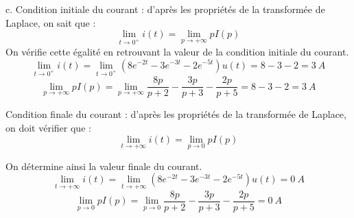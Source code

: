 \documentclass[11pt]{report}
\begin{document}
	\vspace{0.5\baselineskip}
	
	c. Condition initiale du courant : d'après les propriétés de la transformée de Laplace, on sait que :
	\begin{equation*}
		\lim_{t\rightarrow0^{+}} i(t)=\lim_{p \to +\infty} pI(p)
	\end{equation*}
	On vérifie cette égalité en retrouvant la valeur de la condition initiale du courant.
	\begin{equation*}
		\lim_{t\rightarrow0^{+}} i(t)=\lim_{t\rightarrow0^{+}}(8e^{-2t}-3e^{-3t}-2e^{-5t})u(t)=8-3-2=3~A
	\end{equation*}
	\begin{equation*}
		\lim_{p \to +\infty} pI(p)=	\lim_{p \to +\infty} \frac{8p}{p+2}-\frac{3p}{p+3}-\frac{2p}{p+5}=8-3-2=3~A
	\end{equation*}
	
	Condition finale du courant : d'après les propriétés de la transformée de Laplace, on doit vérifier que :
	\begin{equation*}
	\lim_{t \to +\infty} i(t)=\lim_{p \to 0} pI(p)
	\end{equation*}
	
	On détermine ainsi la valeur finale du courant.
	\begin{equation*}
	\lim_{t \to +\infty} i(t)=\lim_{t \to +\infty}(8e^{-2t}-3e^{-3t}-2e^{-5t})u(t)=0~A
	\end{equation*}
	\begin{equation*}
	\lim_{p \to 0} pI(p)=	\lim_{p \to 0} \frac{8p}{p+2}-\frac{3p}{p+3}-\frac{2p}{p+5}=0~A
	\end{equation*}
	
	
	
	
\end{document}

